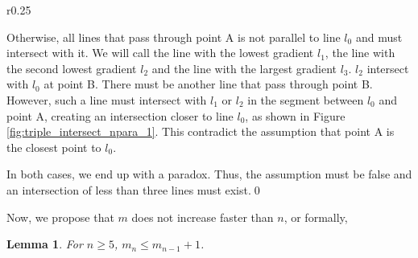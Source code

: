 \documentclass[a4paper, 12pt]{article}
\def\mypindent{1.35cm}
\newenvironment{my_indent}
 {\par\begingroup\leftskip\mypindent}
 {\par\endgroup}
\newcommand{\mycorf}{
    \leftskip-\mypindent
    \captionsetup{margin={-\mypindent,\mypindent}}}
\newtheorem{lemma}[theorem]{Lemma}
\begin{document}
\begin{my_indent}
\begin{wrapfigure}{r}{0.25\textwidth}
    \mycorf
    
    \caption{Contradicting points as a result of the assumption}
    \label{fig:triple_intersect_npara_1}
\end{wrapfigure}
Otherwise, all lines that pass through point A is not parallel to line $l_0$ and must intersect with it. We will call the line with the lowest gradient $l_1$, the line with the second lowest gradient $l_2$ and the line with the largest gradient $l_3$. $l_2$ intersect with $l_0$ at point B. There must be another line that pass through point B. However, such a line must intersect with $l_1$ or $l_2$ in the segment between $l_0$ and point A, creating an intersection closer to line $l_0$, as shown in Figure \ref{fig:triple_intersect_npara_1}. This contradict the assumption that point A is the closest point to $l_0$.

In both cases, we end up with a paradox. Thus, the assumption must be false and an intersection of less than three lines must exist.\qed
\end{my_indent}

Now, we propose that $m$ does not increase faster than $n$, or formally,

\begin{lemma}
\label{theorem:increment}
For $n\geq5$, $m_n\leq m_{n-1}+1$.
\end{lemma}
\end{document}
